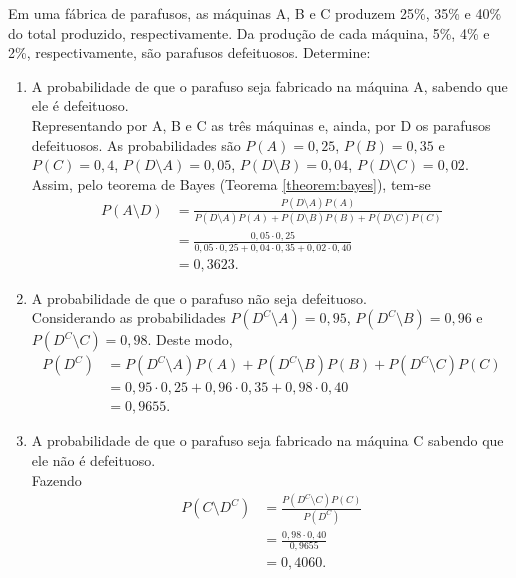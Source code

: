 \documentclass[11pt,fleqn]{book}
\numberwithin{mpicture}{chapter}
\numberwithin{mtable}{chapter}
\numberwithin{mframe}{chapter}
\begin{document}
\begin{pageWidthArea}
	\begin{example}
			Em uma fábrica de parafusos, as máquinas A, B e C produzem 25\%, 35\% e 40\% do total produzido, respectivamente. Da produção de cada máquina, 5\%, 4\% e 2\%, respectivamente, são parafusos defeituosos. Determine:\\
	
			\begin{enumerate}[label=\alph*), itemsep=10pt]
				\item A probabilidade de que o parafuso seja fabricado na máquina A, sabendo que ele é defeituoso.\\
				
				Representando por A, B e C as três máquinas e, ainda, por D os parafusos defeituosos. As probabilidades são $P(A)=0,25$, $P(B)=0,35$ e $P(C)=0,4$, $P(D\setminus A)=0,05$, $P(D\setminus B)=0,04$, $P(D\setminus C)=0,02$. Assim, pelo teorema de Bayes (Teorema \ref{theorem:bayes}), tem-se
				\begin{align*}
					P(A\setminus D) &=
					\frac{
						P(D\setminus A)P(A)
					}{
						P(D\setminus A)P(A)+P(D\setminus B)P(B)+P(D\setminus C)P(C)
					}\\
					&=\frac{0,05\cdot 0,25}{
						0,05\cdot 0,25
						+
						0,04\cdot 0,35
						+
						0,02\cdot 0,40
					}\\
					&=0,3623\text{.}
				\end{align*}
				
				\item A probabilidade de que o parafuso não seja defeituoso.\\
				
				Considerando as probabilidades $P(D^C\setminus A)=0,95$, $P(D^C\setminus B)=0,96$ e $P(D^C\setminus C)=0,98$. Deste modo,
				\begin{align*}
					P(D^C) &= P(D^C\setminus A)P(A)+P(D^C\setminus B)P(B)+P(D^C\setminus C)P(C)\\
					&=0,95\cdot 0,25+0,96\cdot 0,35+0,98\cdot 0,40\\
					&=0,9655\text{.}
				\end{align*}
				
				\item A probabilidade de que o parafuso seja fabricado na máquina C sabendo que ele não é defeituoso.\\
				
				Fazendo
				\begin{align*}
					P(C\setminus D^C)&=\frac{P(D^C\setminus C)P(C)}{P(D^C)}\\
					&=\frac{0,98\cdot 0,40}{0,9655}\\
					&=0,4060\text{.}
				\end{align*}
			\end{enumerate}
	\end{example}
\end{pageWidthArea}
\end{document}
